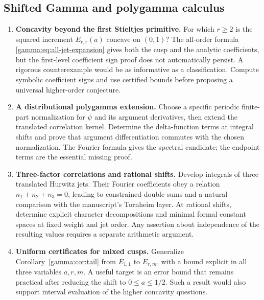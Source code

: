 \subsection{Shifted Gamma and polygamma calculus}
\begin{enumerate}[label=G\arabic*.,leftmargin=*]
\item \textbf{Concavity beyond the first Stieltjes primitive.}
For which $r\geq2$ is the squared increment $E_{r,r}(a)$ concave on
$(0,1)$? The all-order formula \eqref{gamma:eq:all-jet-expansion} gives
both the cusp and the analytic coefficients, but the first-level
coefficient sign proof does not automatically persist. A rigorous
counterexample would be as informative as a classification. Compute
symbolic coefficient signs and use certified bounds before proposing
a universal higher-order conjecture.

\item \textbf{A distributional polygamma extension.}
Choose a specific periodic finite-part normalization for $\psi$ and its
argument derivatives, then extend the translated correlation kernel.
Determine the delta-function terms at integral shifts and prove that
argument differentiation commutes with the chosen normalization.
The Fourier formula gives the spectral candidate; the endpoint terms
are the essential missing proof.

\item \textbf{Three-factor correlations and rational shifts.}
Develop integrals of three translated Hurwitz jets. Their Fourier
coefficients obey a relation $n_1+n_2+n_3=0$, leading to constrained
double sums and a natural comparison with the manuscript's Tornheim
layer. At rational shifts, determine explicit character decompositions
and minimal formal constant spaces at fixed weight and jet order.
Any assertion about independence of the resulting values requires a
separate arithmetic argument.

\item \textbf{Uniform certificates for mixed cusps.}
Generalize Corollary~\ref{gamma:cor:tail} from $E_{1,1}$ to $E_{r,m}$,
with a bound explicit in all three variables $a,r,m$. A useful target
is an error bound that remains practical after reducing the shift to
$0\leq a\leq1/2$. Such a result would also support interval evaluation
of the higher concavity questions.
\end{enumerate}

